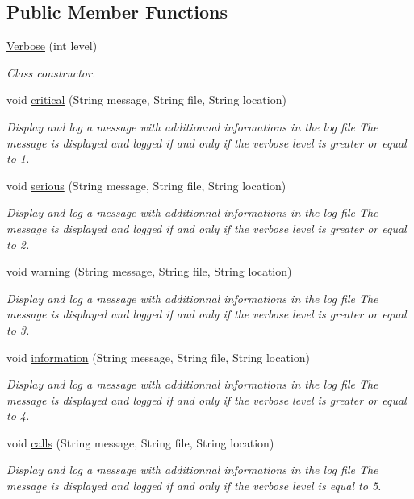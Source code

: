 \subsection*{Public Member Functions}
\begin{DoxyCompactItemize}
\item 
\hyperlink{a00035_a91cd6412ba96325ae848b77964096ee1}{Verbose} (int level)
\begin{DoxyCompactList}\small\item\em Class constructor. \end{DoxyCompactList}\item 
void \hyperlink{a00035_a53cf9993db806e1915527c19db3ee5ba}{critical} (String message, String file, String location)
\begin{DoxyCompactList}\small\item\em Display and log a message with additionnal informations in the log file The message is displayed and logged if and only if the verbose level is greater or equal to 1. \end{DoxyCompactList}\item 
void \hyperlink{a00035_a10446bebb3cca58e71c4355b74fff49a}{serious} (String message, String file, String location)
\begin{DoxyCompactList}\small\item\em Display and log a message with additionnal informations in the log file The message is displayed and logged if and only if the verbose level is greater or equal to 2. \end{DoxyCompactList}\item 
void \hyperlink{a00035_a178f9afaeb03db850592a967ab911dee}{warning} (String message, String file, String location)
\begin{DoxyCompactList}\small\item\em Display and log a message with additionnal informations in the log file The message is displayed and logged if and only if the verbose level is greater or equal to 3. \end{DoxyCompactList}\item 
void \hyperlink{a00035_ab253e41af1fcaf03a062d0586aef7a6e}{information} (String message, String file, String location)
\begin{DoxyCompactList}\small\item\em Display and log a message with additionnal informations in the log file The message is displayed and logged if and only if the verbose level is greater or equal to 4. \end{DoxyCompactList}\item 
void \hyperlink{a00035_ad0eb6503e6bd79e28ae29106f23742ff}{calls} (String message, String file, String location)
\begin{DoxyCompactList}\small\item\em Display and log a message with additionnal informations in the log file The message is displayed and logged if and only if the verbose level is equal to 5. \end{DoxyCompactList}\end{DoxyCompactItemize}
